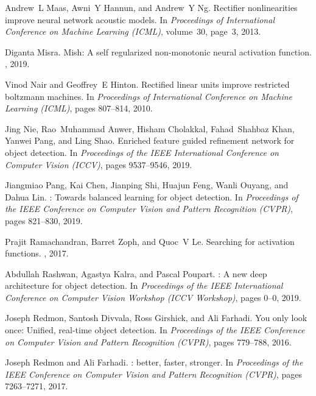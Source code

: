 \documentclass[10pt,twocolumn,letterpaper]{article}
\begin{document}
{\begin{thebibliography}{100}
	Andrew~L Maas, Awni~Y Hannun, and Andrew~Y Ng.
	\newblock Rectifier nonlinearities improve neural network acoustic models.
	\newblock In {\em Proceedings of International Conference on Machine Learning
		(ICML)}, volume~30, page~3, 2013.
	
	Diganta Misra.
	\newblock Mish: A self regularized non-monotonic neural activation function.
	, 2019.
	
	Vinod Nair and Geoffrey~E Hinton.
	\newblock Rectified linear units improve restricted boltzmann machines.
	\newblock In {\em Proceedings of International Conference on Machine Learning
		(ICML)}, pages 807--814, 2010.
	
	Jing Nie, Rao~Muhammad Anwer, Hisham Cholakkal, Fahad~Shahbaz Khan, Yanwei
	Pang, and Ling Shao.
	\newblock Enriched feature guided refinement network for object detection.
	\newblock In {\em Proceedings of the IEEE International Conference on Computer
		Vision (ICCV)}, pages 9537--9546, 2019.
	
	Jiangmiao Pang, Kai Chen, Jianping Shi, Huajun Feng, Wanli Ouyang, and Dahua
	Lin.
	: Towards balanced learning for object detection.
	\newblock In {\em Proceedings of the IEEE Conference on Computer Vision and
		Pattern Recognition (CVPR)}, pages 821--830, 2019.
	
	Prajit Ramachandran, Barret Zoph, and Quoc~V Le.
	\newblock Searching for activation functions.
	, 2017.
	
	Abdullah Rashwan, Agastya Kalra, and Pascal Poupart.
	: A new deep architecture for object detection.
	\newblock In {\em Proceedings of the IEEE International Conference on Computer
		Vision Workshop (ICCV Workshop)}, pages 0--0, 2019.
	
	Joseph Redmon, Santosh Divvala, Ross Girshick, and Ali Farhadi.
	\newblock You only look once: Unified, real-time object detection.
	\newblock In {\em Proceedings of the IEEE Conference on Computer Vision and
		Pattern Recognition (CVPR)}, pages 779--788, 2016.
	
	Joseph Redmon and Ali Farhadi.
	: better, faster, stronger.
	\newblock In {\em Proceedings of the IEEE Conference on Computer Vision and
		Pattern Recognition (CVPR)}, pages 7263--7271, 2017.
	

\end{thebibliography}}
\end{document}
